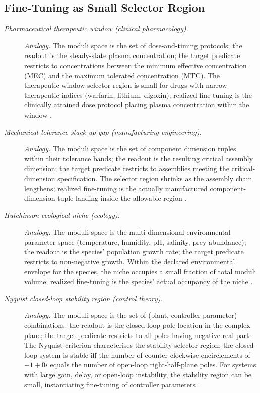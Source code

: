 \subsection*{ Fine-Tuning as Small Selector Region}
\begingroup\small
\begin{description}
\item[\emph{Pharmaceutical therapeutic window
(clinical pharmacology).}] \textit{Analogy.}
The moduli space is the set of dose-and-timing
protocols; the readout is the steady-state plasma
concentration; the target predicate restricts to
concentrations between the minimum effective
concentration (MEC) and the maximum tolerated
concentration (MTC).  The therapeutic-window selector
region is small for drugs with narrow therapeutic
indices (warfarin, lithium, digoxin); realized
fine-tuning is the clinically attained dose protocol
placing plasma concentration within the window
\citep{GoodmanGilman2018Pharmacology}.

\item[\emph{Mechanical tolerance stack-up gap
(manufacturing engineering).}] \textit{Analogy.}
The moduli space is the set of component dimension
tuples within their tolerance bands; the readout is
the resulting critical assembly dimension; the
target predicate restricts to assemblies meeting the
critical-dimension specification.  The selector
region shrinks as the assembly chain lengthens;
realized fine-tuning is the actually manufactured
component-dimension tuple landing inside the
allowable region \citep{Bjorke1989Tolerance}.

\item[\emph{Hutchinson ecological niche (ecology).}] \textit{Analogy.}
The moduli space is the multi-dimensional
environmental parameter space (temperature,
humidity, pH, salinity, prey abundance); the readout
is the species' population growth rate; the target
predicate restricts to non-negative growth.  Within
the declared environmental envelope for the species,
the niche occupies a small fraction of total moduli
volume; realized fine-tuning is the species' actual
occupancy of the niche
\citep{Hutchinson1957Concluding}.

\item[\emph{Nyquist closed-loop stability region
(control theory).}] \textit{Analogy.}
The moduli space is the set of (plant,
controller-parameter) combinations; the readout is
the closed-loop pole location in the complex plane;
the target predicate restricts to all poles having
negative real part.  The Nyquist criterion
characterises the stability selector region: the
closed-loop system is stable iff the number of
counter-clockwise encirclements of \(-1+0i\) equals
the number of open-loop right-half-plane poles.  For
systems with large gain, delay, or open-loop
instability, the stability region can be small,
instantiating  fine-tuning of controller
parameters \citep{Nyquist1932Regeneration}.
\end{description}
\endgroup


